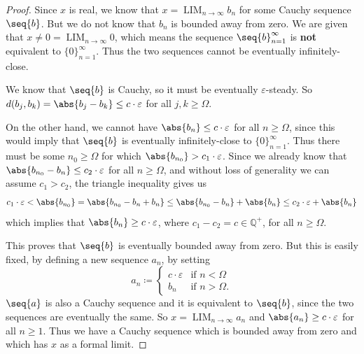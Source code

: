 { \label{lem:2}
\begin{proof}
    Since $x$ is real, we know that $x=\operatorname{LIM}_{n\to\infty}b_n$ for some Cauchy sequence $\seq{b}$. But we do not know that $b_n$ is bounded away from zero. We are given that $x \neq 0 = \operatorname{LIM}_{n\to\infty}0$, which means the sequence $\seq{b}_{n=1}^\infty$ is \textbf{not} equivalent to $\{0\}_{n=1}^\infty$. Thus the two sequences cannot be eventually infinitely-close. 
    
    We know that $\seq{b}$ is Cauchy, so it must be eventually $\varepsilon$-steady. So $d(b_j, b_k) = \abs{b_j - b_k} \leq c \cdot \varepsilon$ for all $j,k \geq \Omega$.

    On the other hand, we cannot have $\abs{b_n} \leq c \cdot \varepsilon$ for all $n \geq \Omega$, since this would imply that $\seq{b}$ is eventually infinitely-close to $\{0\}_{n=1}^\infty$. Thus there must be some $n_0 \geq \Omega$ for which $\abs{b_{n_0}} > c_1 \cdot \varepsilon$. Since we already know that $\abs{b_{n_0}-b_n} \leq c_2 \cdot \varepsilon$ for all $n\geq \Omega$, and without loss of generality we can assume $c_1>c_2$, the triangle inequality gives us
    \begin{equation*}
        c_1 \cdot \varepsilon <\abs{b_{n_0}} = \abs{b_{n_0} - b_n + b_n} \leq \abs{b_{n_0} - b_n} + \abs{b_n} \leq c_2 \cdot \varepsilon + \abs{b_n}
    \end{equation*}
    which implies that $\abs{b_n} \geq c \cdot \varepsilon$, where $c_1 - c_2 = c \in \mathbb{Q}^+$, for all $n\geq \Omega$.

    This proves that $\seq{b}$ is eventually bounded away from zero. But this is easily fixed, by defining a new sequence $a_n$, by setting
    \begin{equation*}
a_n \coloneqq
\begin{cases}
c \cdot \varepsilon & \text{if } n < \Omega \\
b_n & \text{if } n > \Omega.
\end{cases}
    \end{equation*}
    $\seq{a}$ is also a Cauchy sequence and it is equivalent to $\seq{b}$, since the two sequences are eventually the same. So $x=\operatorname{LIM}_{n\to\infty}a_n$ and $\abs{a_n} \geq c \cdot \varepsilon$ for all $n \geq 1$. Thus we have a Cauchy sequence which is bounded away from zero and which has $x$ as a formal limit.
\end{proof}

}
